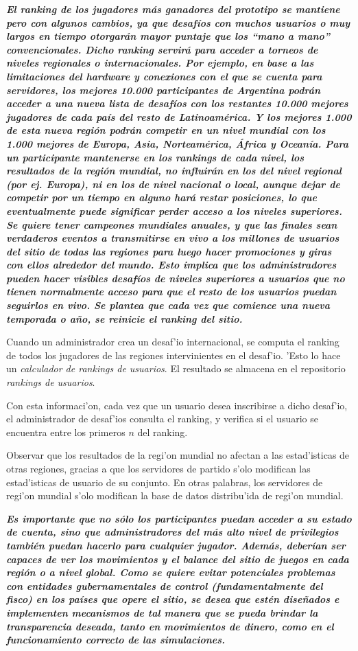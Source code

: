 \textbf{\textit{El ranking de los jugadores más ganadores del prototipo se mantiene pero con algunos cambios, ya que desafíos con muchos usuarios o muy largos en tiempo otorgarán mayor puntaje que los “mano a mano” convencionales. Dicho ranking servirá para acceder a torneos de niveles regionales o internacionales. Por ejemplo, en base a las limitaciones del hardware y conexiones con el que se cuenta para servidores, los mejores 10.000 participantes de Argentina podrán acceder a una nueva lista de desafíos con los restantes 10.000 mejores jugadores de cada país del resto de Latinoamérica. Y los mejores 1.000 de esta nueva región podrán competir en un nivel mundial con los 1.000 mejores de Europa, Asia, Norteamérica, África y Oceanía.
Para un participante mantenerse en los rankings de cada nivel, los resultados de la región mundial, no influirán en los del nivel regional (por ej. Europa), ni en los de nivel nacional o local, aunque dejar de competir por un tiempo en alguno hará restar posiciones, lo que eventualmente puede significar perder acceso a los niveles superiores. Se quiere tener campeones mundiales anuales, y que las finales sean verdaderos eventos a transmitirse en vivo a los millones de usuarios del sitio de todas las regiones para luego hacer promociones y giras con ellos alrededor del mundo. Esto implica que los administradores pueden hacer visibles desafíos de niveles superiores a usuarios que no tienen normalmente acceso para que el resto de los usuarios puedan seguirlos en vivo. Se plantea que cada vez que comience una nueva temporada o año, se reinicie el ranking del sitio.
}}

Cuando un administrador crea un desaf'io internacional, se computa el ranking de todos los jugadores de las regiones intervinientes en el desaf'io. 'Esto lo hace un \textit{calculador de rankings de usuarios}. El resultado se almacena en el repositorio \textit{rankings de usuarios}.

Con esta informaci'on, cada vez que un usuario desea inscribirse a dicho desaf'io, el administrador de desaf'ios consulta el ranking, y verifica si el usuario se encuentra entre los primeros $n$ del ranking.

Observar que los resultados de la regi'on mundial no afectan a las estad'isticas de otras regiones, gracias a que los servidores de partido s'olo modifican las estad'isticas de usuario de su conjunto. En otras palabras, los servidores de regi'on mundial s'olo modifican la base de datos distribu'ida de regi'on mundial.

\textbf{\textit{
Es importante que no sólo los participantes puedan acceder a su estado de cuenta, sino que administradores del más alto nivel de privilegios también puedan hacerlo para cualquier jugador. Además, deberían ser capaces de ver los movimientos y el balance del sitio de juegos en cada región o a nivel global. Como se quiere evitar potenciales problemas con entidades gubernamentales de control (fundamentalmente del fisco) en los países que opere el sitio, se desea que estén diseñados e implementen mecanismos de tal manera que se pueda brindar la transparencia deseada, tanto en movimientos de dinero, como en el funcionamiento correcto de las simulaciones.
}}

